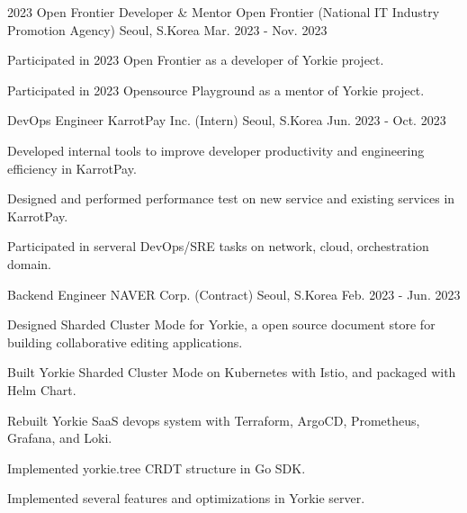 

\begin{cventries}

\cventry
    {2023 Open Frontier Developer \& Mentor} %
    {Open Frontier (National IT Industry Promotion Agency)} %
    {Seoul, S.Korea} %
    {Mar. 2023 - Nov. 2023} %
    {
      \begin{cvitems} %
        \item {Participated in 2023 Open Frontier as a developer of Yorkie project.}
        \item {Participated in 2023 Opensource Playground as a mentor of Yorkie project.}
      \end{cvitems}
    }

\cventry
    {DevOps Engineer} %
    {KarrotPay Inc. (Intern)} %
    {Seoul, S.Korea} %
    {Jun. 2023 - Oct. 2023} %
    {
      \begin{cvitems} %
        \item {Developed internal tools to improve developer productivity and engineering efficiency in KarrotPay.}
        \item {Designed and performed performance test on new service and existing services in KarrotPay.}
        \item {Participated in serveral DevOps/SRE tasks on network, cloud, orchestration domain.}
      \end{cvitems}
    }

  \cventry
    {Backend Engineer} %
    {NAVER Corp. (Contract)} %
    {Seoul, S.Korea} %
    {Feb. 2023 - Jun. 2023} %
    {
      \begin{cvitems} %
        \item {Designed Sharded Cluster Mode for Yorkie, a open source document store for building collaborative editing applications.}
        \item {Built Yorkie Sharded Cluster Mode on Kubernetes with Istio, and packaged with Helm Chart.}
        \item {Rebuilt Yorkie SaaS devops system with Terraform, ArgoCD, Prometheus, Grafana, and Loki.}
        \item {Implemented yorkie.tree CRDT structure in Go SDK.}
        \item {Implemented several features and optimizations in Yorkie server.}
      \end{cvitems}
    }


\end{cventries}
